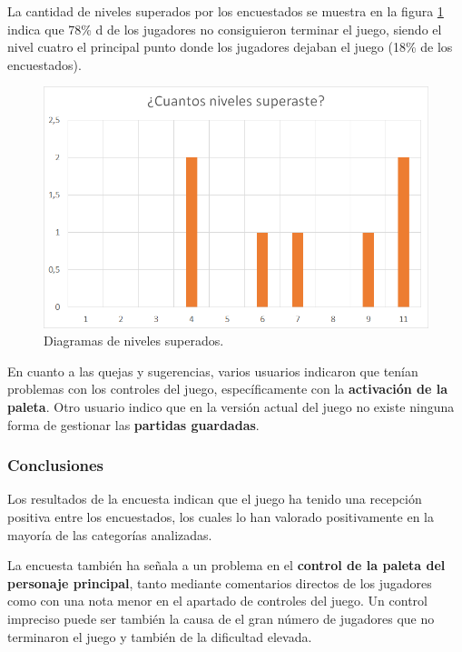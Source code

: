 La cantidad de niveles superados por los encuestados se muestra en la figura \ref{tabla_niveles} indica que 78\% d de los jugadores no consiguieron terminar el juego, siendo el nivel cuatro el principal punto donde los jugadores dejaban el juego (18\% de los encuestados).
\begin{figure}[!t]
   \includegraphics[width=0.9\linewidth, left]{images/resultados/encuesta/niveles}
   \caption{Diagramas de niveles superados.}
   \label{tabla_niveles}
\end{figure}

En cuanto a las quejas y sugerencias, varios usuarios indicaron que tenían problemas con los controles del juego, específicamente con la \textbf{activación de la paleta}. Otro usuario indico que en la versión actual del juego no existe ninguna forma de gestionar las \textbf{partidas guardadas}.

\subsubsection{Conclusiones}
Los resultados de la encuesta indican que el juego ha tenido una recepción positiva entre los encuestados, los cuales lo han valorado positivamente en la mayoría de las categorías analizadas.

La encuesta también ha señala a un problema en el \textbf{control de la paleta del personaje principal}, tanto mediante comentarios directos de los jugadores como con una nota menor en el apartado de controles del juego. Un control impreciso puede ser también la causa de el gran número de jugadores que no terminaron el juego y también de la dificultad elevada.
